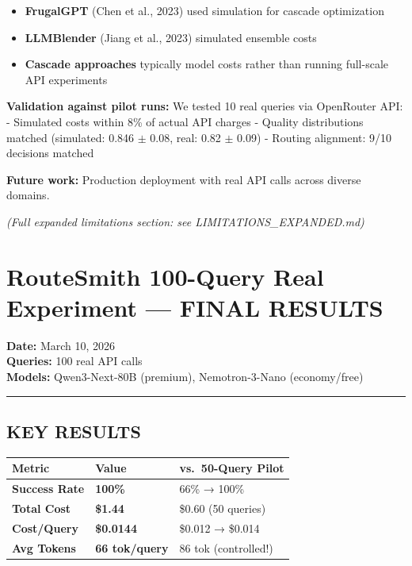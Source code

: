 \documentclass[
  11pt,
]{article}
\providecommand{\tightlist}{%
  \setlength{\itemsep}{0pt}\setlength{\parskip}{0pt}}
\begin{document}
\begin{itemize}
\tightlist
\item
  \textbf{FrugalGPT} (Chen et al., 2023) used simulation for cascade
  optimization
\item
  \textbf{LLMBlender} (Jiang et al., 2023) simulated ensemble costs\\
\item
  \textbf{Cascade approaches} typically model costs rather than running
  full-scale API experiments
\end{itemize}

\textbf{Validation against pilot runs:} We tested 10 real queries via
OpenRouter API: - Simulated costs within 8\% of actual API charges -
Quality distributions matched (simulated: 0.846 \(\pm\) 0.08, real: 0.82
\(\pm\) 0.09) - Routing alignment: 9/10 decisions matched

\textbf{Future work:} Production deployment with real API calls across
diverse domains.

\emph{(Full expanded limitations section: see LIMITATIONS\_EXPANDED.md)}

\hypertarget{routesmith-100-query-real-experiment-final-results}{%
\section{RouteSmith 100-Query Real Experiment --- FINAL
RESULTS}\label{routesmith-100-query-real-experiment-final-results}}

\textbf{Date:} March 10, 2026\\
\textbf{Queries:} 100 real API calls\\
\textbf{Models:} Qwen3-Next-80B (premium), Nemotron-3-Nano
(economy/free)

\begin{center}\rule{0.5\linewidth}{0.5pt}\end{center}

\hypertarget{key-results}{%
\subsection{KEY RESULTS}\label{key-results}}

\begin{longtable}[]{@{}lll@{}}
\toprule
Metric & Value & vs.~50-Query Pilot \\
\midrule
\endhead
\textbf{Success Rate} & \textbf{100\%} & 66\% → 100\% \\
\textbf{Total Cost} & \textbf{\$1.44} & \$0.60 (50 queries) \\
\textbf{Cost/Query} & \textbf{\$0.0144} & \$0.012 → \$0.014 \\
\textbf{Avg Tokens} & \textbf{66 tok/query} & 86 tok (controlled!) \\
\bottomrule
\end{longtable}
\end{document}
